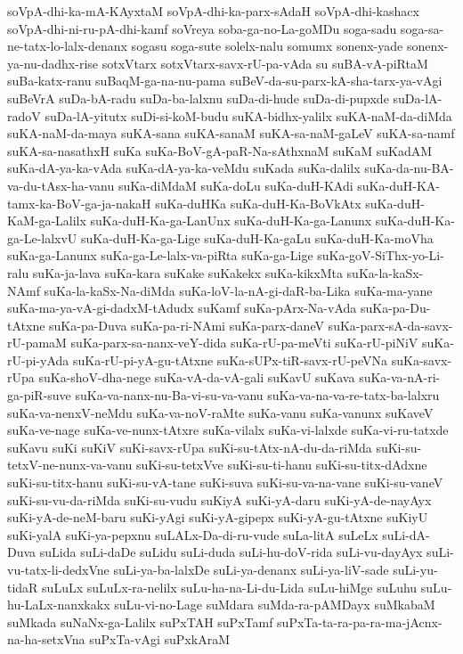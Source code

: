 {soVpA-dhi-ka-mA-KAyxtaM
soVpA-dhi-ka-parx-sAdaH
soVpA-dhi-kashacx
soVpA-dhi-ni-ru-pA-dhi-kamf
soVreya
soba-ga-no-La-goMDu
soga-sadu
soga-sa-ne-tatx-lo-lalx-denanx
sogasu
soga-sute
solelx-nalu
somumx
sonenx-yade
sonenx-ya-nu-dadhx-rise
sotxVtarx
sotxVtarx-savx-rU-pa-vAda
su
suBA-vA-piRtaM
suBa-katx-ranu
suBaqM-ga-na-nu-pama
suBeV-da-su-parx-kA-sha-tarx-ya-vAgi
suBeVrA
suDa-bA-radu
suDa-ba-lalxnu
suDa-di-hude
suDa-di-pupxde
suDa-lA-radoV
suDa-lA-yitutx
suDi-si-koM-budu
suKA-bidhx-yalilx
suKA-naM-da-diMda
suKA-naM-da-maya
suKA-sana
suKA-sanaM
suKA-sa-naM-gaLeV
suKA-sa-namf
suKA-sa-nasathxH
suKa
suKa-BoV-gA-paR-Na-sAthxnaM
suKaM
suKadAM
suKa-dA-ya-ka-vAda
suKa-dA-ya-ka-veMdu
suKada
suKa-dalilx
suKa-da-nu-BA-va-du-tAsx-ha-vanu
suKa-diMdaM
suKa-doLu
suKa-duH-KAdi
suKa-duH-KA-tamx-ka-BoV-ga-ja-nakaH
suKa-duHKa
suKa-duH-Ka-BoVkAtx
suKa-duH-KaM-ga-Lalilx
suKa-duH-Ka-ga-LanUnx
suKa-duH-Ka-ga-Lanunx
suKa-duH-Ka-ga-Le-lalxvU
suKa-duH-Ka-ga-Lige
suKa-duH-Ka-gaLu
suKa-duH-Ka-moVha
suKa-ga-Lanunx
suKa-ga-Le-lalx-va-piRta
suKa-ga-Lige
suKa-goV-SiThx-yo-Li-ralu
suKa-ja-lava
suKa-kara
suKake
suKakekx
suKa-kikxMta
suKa-la-kaSx-NAmf
suKa-la-kaSx-Na-diMda
suKa-loV-la-nA-gi-daR-ba-Lika
suKa-ma-yane
suKa-ma-ya-vA-gi-dadxM-tAdudx
suKamf
suKa-pArx-Na-vAda
suKa-pa-Du-tAtxne
suKa-pa-Duva
suKa-pa-ri-NAmi
suKa-parx-daneV
suKa-parx-sA-da-savx-rU-pamaM
suKa-parx-sa-nanx-veY-dida
suKa-rU-pa-meVti
suKa-rU-piNiV
suKa-rU-pi-yAda
suKa-rU-pi-yA-gu-tAtxne
suKa-sUPx-tiR-savx-rU-peVNa
suKa-savx-rUpa
suKa-shoV-dha-nege
suKa-vA-da-vA-gali
suKavU
suKava
suKa-va-nA-ri-ga-piR-suve
suKa-va-nanx-nu-Ba-vi-su-va-vanu
suKa-va-na-va-re-tatx-ba-lalxru
suKa-va-nenxV-neMdu
suKa-va-noV-raMte
suKa-vanu
suKa-vanunx
suKaveV
suKa-ve-nage
suKa-ve-nunx-tAtxre
suKa-vilalx
suKa-vi-lalxde
suKa-vi-ru-tatxde
suKavu
suKi
suKiV
suKi-savx-rUpa
suKi-su-tAtx-nA-du-da-riMda
suKi-su-tetxV-ne-nunx-va-vanu
suKi-su-tetxVve
suKi-su-ti-hanu
suKi-su-titx-dAdxne
suKi-su-titx-hanu
suKi-su-vA-tane
suKi-suva
suKi-su-va-na-vane
suKi-su-vaneV
suKi-su-vu-da-riMda
suKi-su-vudu
suKiyA
suKi-yA-daru
suKi-yA-de-nayAyx
suKi-yA-de-neM-baru
suKi-yAgi
suKi-yA-gipepx
suKi-yA-gu-tAtxne
suKiyU
suKi-yalA
suKi-ya-pepxnu
suLALx-Da-di-ru-vude
suLa-litA
suLeLx
suLi-dA-Duva
suLida
suLi-daDe
suLidu
suLi-duda
suLi-hu-doV-rida
suLi-vu-dayAyx
suLi-vu-tatx-li-dedxVne
suLi-ya-ba-lalxDe
suLi-ya-denanx
suLi-ya-liV-sade
suLi-yu-tidaR
suLuLx
suLuLx-ra-nelilx
suLu-ha-na-Li-du-Lida
suLu-hiMge
suLuhu
suLu-hu-LaLx-nanxkakx
suLu-vi-no-Lage
suMdara
suMda-ra-pAMDayx
suMkabaM
suMkada
suNaNx-ga-Lalilx
suPxTAH
suPxTamf
suPxTa-ta-ra-pa-ra-ma-jAcnx-na-ha-setxVna
suPxTa-vAgi
suPxkAraM
}

